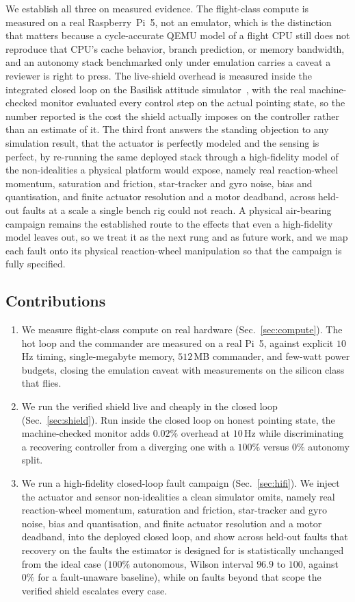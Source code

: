 \documentclass[11pt]{article}
\begin{document}
We establish all three on measured evidence. The flight-class compute is measured on a real
Raspberry~Pi~5, not an emulator, which is the distinction that matters because a cycle-accurate
QEMU model of a flight CPU still does not reproduce that CPU's cache behavior, branch prediction,
or memory bandwidth, and an autonomy stack benchmarked only under emulation carries a caveat a
reviewer is right to press. The live-shield overhead is measured inside the integrated closed
loop on the Basilisk attitude simulator~\cite{Basilisk}, with the real machine-checked monitor
evaluated every control step on the actual pointing state, so the number reported is the cost the
shield actually imposes on the controller rather than an estimate of it. The third front answers
the standing objection to any simulation result, that the actuator is perfectly modeled and the
sensing is perfect, by re-running the same deployed stack through a high-fidelity model of the
non-idealities a physical platform would expose, namely real reaction-wheel momentum, saturation
and friction, star-tracker and gyro noise, bias and quantisation, and finite actuator resolution
and a motor deadband, across held-out faults at a scale a single bench rig could not reach. A
physical air-bearing campaign remains the established route to the effects that even a
high-fidelity model leaves out, so we treat it as the next rung and as future work, and we map
each fault onto its physical reaction-wheel manipulation so that the campaign is fully specified.

\subsection{Contributions}
\begin{enumerate}[leftmargin=1.5em,itemsep=2pt]
\item We measure flight-class compute on real hardware (Sec.~\ref{sec:compute}). The hot
loop and the commander are measured on a real Pi~5, against explicit $10$\,Hz timing, single-megabyte
memory, $512$\,MB commander, and few-watt power budgets, closing the emulation caveat with
measurements on the silicon class that flies.
\item We run the verified shield live and cheaply in the closed loop (Sec.~\ref{sec:shield}). Run inside the closed
loop on honest pointing state, the machine-checked monitor adds $0.02\%$ overhead at $10$\,Hz while
discriminating a recovering controller from a diverging one with a $100\%$ versus $0\%$ autonomy
split.
\item We run a high-fidelity closed-loop fault campaign (Sec.~\ref{sec:hifi}). We inject the
actuator and sensor non-idealities a clean simulator omits, namely real reaction-wheel momentum,
saturation and friction, star-tracker and gyro noise, bias and quantisation, and finite actuator
resolution and a motor deadband, into the deployed closed loop, and show across held-out faults
that recovery on the faults the estimator is designed for is statistically unchanged from the
ideal case ($100\%$ autonomous, Wilson interval $96.9$ to $100$, against $0\%$ for a
fault-unaware baseline), while on faults beyond that scope the verified shield escalates every
case.
\end{enumerate}
\end{document}
